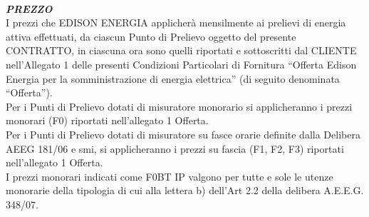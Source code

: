 \documentclass[a4paper,8pt,notitlepage]{article}%
\begin{document}
\noindent \\ \textbf{\textit{PREZZO}}\\

\noindent I prezzi che EDISON ENERGIA applicherà mensilmente ai prelievi di energia attiva effettuati, da ciascun Punto di Prelievo oggetto del presente CONTRATTO, in ciascuna ora sono quelli riportati e sottoscritti dal CLIENTE nell'Allegato 1 delle presenti Condizioni Particolari di Fornitura ``Offerta Edison Energia per la somministrazione di energia elettrica'' (di seguito denominata ``Offerta'').\\

\noindent Per i Punti di Prelievo dotati di misuratore monorario si applicheranno i prezzi monorari (F0) riportati nell'allegato 1 Offerta.\\

\noindent Per i Punti di Prelievo dotati di misuratore su fasce orarie definite dalla Delibera AEEG 181/06 e smi, si applicheranno i prezzi su fascia (F1, F2, F3) riportati nell'allegato 1 Offerta.\\

\noindent I prezzi monorari indicati come F0BT IP valgono per tutte e sole le utenze monorarie della tipologia di cui alla lettera b) dell’Art 2.2 della delibera A.E.E.G. 348/07.\\
\end{document}
